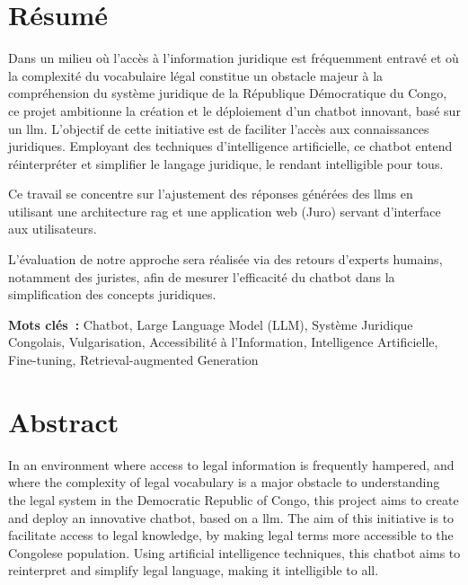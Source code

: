 
\renewcommand{\abstractname}{Résumé} %

\begingroup
\let\clearpage\relax
\let\cleardoublepage\relax
\let\cleardoublepage\relax

\chapter*{Résumé}
Dans un milieu où l'accès à l'information juridique est fréquemment entravé et où la complexité du vocabulaire légal constitue un obstacle majeur à la compréhension du système juridique de la République Démocratique du Congo, ce projet ambitionne la création et le déploiement d'un chatbot innovant, basé sur un \ac{llm}. L'objectif de cette initiative est de faciliter l'accès aux connaissances juridiques. Employant des techniques d'intelligence artificielle, ce chatbot entend réinterpréter et simplifier le langage juridique, le rendant intelligible pour tous.

Ce travail se concentre sur l'ajustement des réponses générées des \acfp{llm} en utilisant une architecture \ac{rag} et une application web (Juro) servant d'interface aux utilisateurs.

L'évaluation de notre approche sera réalisée via des retours d'experts humains, notamment des juristes, afin de mesurer l'efficacité du chatbot dans la simplification des concepts juridiques.

\vspace{1cm}
\textbf{Mots clés~:} Chatbot, Large Language Model (LLM), Système Juridique Congolais, Vulgarisation, Accessibilité à l'Information, Intelligence Artificielle, Fine-tuning, Retrieval-augmented Generation

\endgroup			

\vfill

\pagebreak



\begingroup
\let\clearpage\relax
\let\cleardoublepage\relax
\let\cleardoublepage\relax

\chapter*{Abstract}
In an environment where access to legal information is frequently hampered, and where the complexity of legal vocabulary is a major obstacle to understanding the legal system in the Democratic Republic of Congo, this project aims to create and deploy an innovative chatbot, based on a \ac{llm}. The aim of this initiative is to facilitate access to legal knowledge, by making legal terms more accessible to the Congolese population. Using artificial intelligence techniques, this chatbot aims to reinterpret and simplify legal language, making it intelligible to all.

